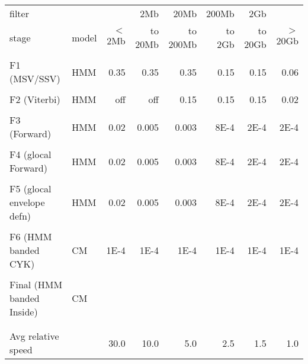 %
\begin{table}
\begin{tabular}{ll||r|r|r|r|r|r|}
filter &               &         & 2Mb     & 20Mb     & 200Mb  & 2Gb     &          \\
stage  & model         & $<$ 2Mb & to 20Mb & to 200Mb & to 2Gb & to 20Gb & $>$ 20Gb \\  \hline
& & & & & & & \\
F1 (MSV/SSV) & HMM & 0.35 & 0.35 & 0.35 & 0.15 & 0.15 & 0.06 \\
& & & & & & & \\
F2 (Viterbi) & HMM & off & off & 0.15 & 0.15 & 0.15 & 0.02 \\
& & & & & & & \\
F3 (Forward) & HMM & 0.02 & 0.005 & 0.003 & 8E-4 & 2E-4 & 2E-4 \\
& & & & & & & \\
F4 (glocal Forward) & HMM & 0.02 & 0.005 & 0.003 & 8E-4 & 2E-4 & 2E-4 \\
& & & & & & & \\
F5 (glocal envelope defn)  & HMM & 0.02 & 0.005 & 0.003 & 8E-4 & 2E-4 & 2E-4 \\
& & & & & & & \\
F6 (HMM banded CYK)  & CM & 1E-4 & 1E-4 & 1E-4 & 1E-4 & 1E-4 & 1E-4 \\
& & & & & & & \\
Final (HMM banded Inside)& CM &  & & & & & \\ \hline
& & & & & & & \\
& & & & & & & \\
Avg relative speed   & & 30.0 & 10.0 & 5.0 & 2.5 & 1.5 & 1.0 \\
\end{tabular}
\end{table}

